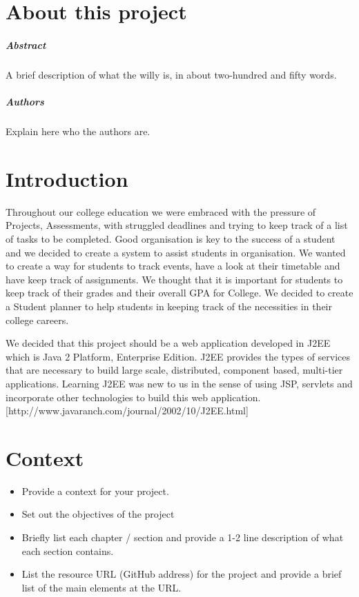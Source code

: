 
\chapter*{About this project}
\paragraph{Abstract}
A brief description of what the willy is, in about two-hundred and fifty words.

\paragraph{Authors}
Explain here who the authors are.



\chapter{Introduction}
Throughout our college education we were embraced with the pressure of Projects, Assessments, with struggled deadlines and trying to keep track of a list of tasks to be completed. Good organisation is key to the success of a student and we decided to create a system to assist students in organisation. We wanted to create a way for students to track events, have a look at their timetable and have keep track of assignments. We thought that it is important for students to keep track of their grades and their overall GPA for College. We decided to create a Student planner to help students in keeping track of the necessities in their college careers. 

We decided that this project should be a web application developed in J2EE which is Java 2 Platform, Enterprise Edition. J2EE provides the types of services that are necessary to build large scale, distributed, component based, multi-tier applications. Learning J2EE was new to us in the sense of using JSP, servlets and incorporate other technologies to build this web application.
[http://www.javaranch.com/journal/2002/10/J2EE.html]

\chapter{Context}
\begin{itemize}
\item Provide a context for your project.
\item Set out the objectives of the project
\item Briefly list each chapter / section and provide a 1-2 line description of what each section contains.
\item List the resource URL (GitHub address) for the project and provide a brief list of the main elements at the URL.
\end{itemize}

